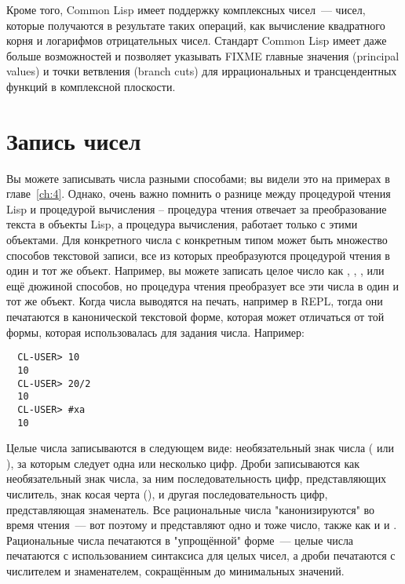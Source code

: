 Кроме того, Common Lisp имеет поддержку комплексных чисел~--- чисел, которые получаются в
результате таких операций, как вычисление квадратного корня и логарифмов отрицательных
чисел. Стандарт Common Lisp имеет даже больше возможностей и позволяет указывать FIXME
главные значения (principal values) и точки ветвления (branch cuts) для иррациональных и
трансцендентных функций в комплексной плоскости.

\section{Запись чисел}

Вы можете записывать числа разными способами; вы видели это на примерах в
главе~\ref{ch:4}.  Однако, очень важно помнить о разнице между процедурой чтения Lisp и
процедурой вычисления -- процедура чтения отвечает за преобразование текста в объекты
Lisp, а процедура вычисления, работает только с этими объектами.  Для конкретного числа с
конкретным типом может быть множество способов текстовой записи, все из которых
преобразуются процедурой чтения в один и тот же объект.  Например, вы можете записать
целое число  как , , , или ещё дюжиной способов,
но процедура чтения преобразует все эти числа в один и тот же объект.  Когда числа
выводятся на печать, например в REPL, тогда они печатаются в канонической текстовой форме,
которая может отличаться от той формы, которая использовалась для задания числа.
Например:

\begin{verbatim}
  CL-USER> 10
  10
  CL-USER> 20/2
  10
  CL-USER> #xa
  10
\end{verbatim}

Целые числа записываются в следующем виде: необязательный знак числа (\code{+} или
\code{-}), за которым следует одна или несколько цифр.  Дроби записываются как
необязательный знак числа, за ним последовательность цифр, представляющих числитель, знак
косая черта (\code{/}), и другая последовательность цифр, представляющая знаменатель.  Все
рациональные числа "канонизируются" во время чтения~--- вот поэтому  и 
представляют одно и тоже число, также как и  и .  Рациональные числа
печатаются в "упрощённой" форме~--- целые числа печатаются с использованием синтаксиса для
целых чисел, а дроби печатаются с числителем и знаменателем, сокращённым до минимальных
значений.

